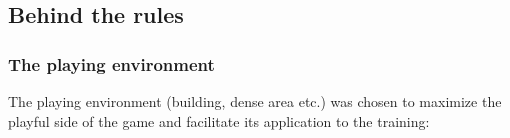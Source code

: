 \documentclass[11pt]{article} %
\begin{document}
\subsection{Behind the rules}
\subsubsection{The playing environment}
The playing environment (building, dense area etc.) was chosen to maximize 
the playful side of the game and facilitate its application to the training: 

\end{document}
